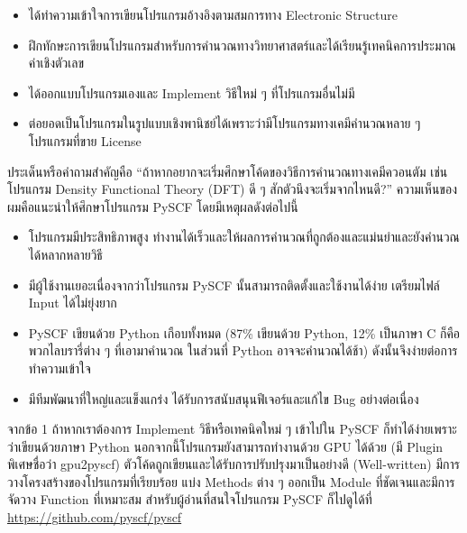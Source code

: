 \begin{itemize}
    \item ได้ทำความเข้าใจการเขียนโปรแกรมอ้างอิงตามสมการทาง Electronic Structure 
    
    \item ฝึกทักษะการเขียนโปรแกรมสำหรับการคำนวณทางวิทยาศาสตร์และได้เรียนรู้เทคนิคการประมาณค่าเชิงตัวเลข
    
    \item ได้ออกแบบโปรแกรมเองและ Implement วิธีใหม่ ๆ ที่โปรแกรมอื่นไม่มี
    
    \item ต่อยอดเป็นโปรแกรมในรูปแบบเชิงพานิชย์ได้เพราะว่ามีโปรแกรมทางเคมีคำนวณหลาย ๆ โปรแกรมที่ขาย License
\end{itemize}

ประเด็นหรือคำถามสำคัญคือ \enquote{ถ้าหากอยากจะเริ่มศึกษาโค้ดของวิธีการคำนวณทางเคมีควอนตัม เช่น โปรแกรม Density Functional 
Theory (DFT) ดี ๆ สักตัวนึงจะเริ่มจากไหนดี?} ความเห็นของผมคือแนะนำให้ศึกษาโปรแกรม PySCF โดยมีเหตุผลดังต่อไปนี้

\begin{itemize}
    \item โปรแกรมมีประสิทธิภาพสูง ทำงานได้เร็วและให้ผลการคำนวณที่ถูกต้องและแม่นยำและยังคำนวณได้หลากหลายวิธี
    
    \item มีผู้ใช้งานเยอะเนื่องจากว่าโปรแกรม PySCF นั้นสามารถติดตั้งและใช้งานได้ง่าย เตรียมไฟล์ Input ได้ไม่ยุ่งยาก 
    
    \item PySCF เขียนด้วย Python เกือบทั้งหมด (87\% เขียนด้วย Python, 12\% เป็นภาษา C ก็คือพวกไลบรารี่ต่าง ๆ ที่เอามาคำนวณ%
    ในส่วนที่ Python อาจจะคำนวณได้ช้า) ดังนั้นจึงง่ายต่อการทำความเข้าใจ
    
    \item มีทีมพัฒนาที่ใหญ่และแข็งแกร่ง ได้รับการสนับสนุนฟีเจอร์และแก้ไข Bug อย่างต่อเนื่อง
\end{itemize}
    
\noindent จากข้อ 1 ถ้าหากเราต้องการ Implement วิธีหรือเทคนิคใหม่ ๆ เข้าไปใน PySCF ก็ทำได้ง่ายเพราะว่าเขียนด้วยภาษา Python 
นอกจากนี้โปรแกรมยังสามารถทำงานด้วย GPU ได้ด้วย (มี Plugin พิเศษชื่อว่า gpu2pyscf) ตัวโค้ดถูกเขียนและได้รับการปรับปรุงมาเป็นอย่างดี 
(Well-written) มีการวางโครงสร้างของโปรแกรมที่เรียบร้อย แบ่ง Methods ต่าง ๆ ออกเป็น Module ที่ชัดเจนและมีการจัดวาง Function 
ที่เหมาะสม สำหรับผู้อ่านที่สนใจโปรแกรม PySCF ก็ไปดูได้ที่ \url{https://github.com/pyscf/pyscf}

